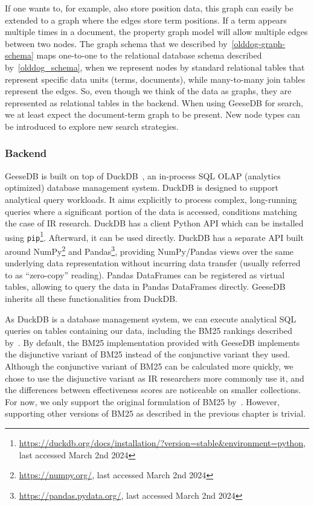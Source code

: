If one wants to, for example, also store position data, this graph can easily be extended to a graph where the edges store term positions. If a term appears multiple times in a document, the property graph model will allow multiple edges between two nodes. The graph schema that we described by~\cref{olddog-graph-schema} maps one-to-one to the relational database schema described by~\cref{olddog_schema}, when we represent nodes by standard relational tables that represent specific data units (terms, documents), while many-to-many join tables represent the edges. So, even though we think of the data as graphs, they are represented as relational tables in the backend. When using GeeseDB for search, we at least expect the document-term graph to be present. New node types can be introduced to explore new search strategies. 

\subsubsection{Backend}
GeeseDB is built on top of DuckDB~\citep{duckdb}, an in-process SQL OLAP (analytics optimized) database management system. DuckDB is designed to support analytical query workloads. It aims explicitly to process complex, long-running queries where a significant portion of the data is accessed, conditions matching the case of IR research. DuckDB has a client Python API which can be installed using \texttt{pip}\footnote{\url{https://duckdb.org/docs/installation/?version=stable&environment=python}, last accessed March 2nd 2024}. Afterward, it can be used directly. DuckDB has a separate API built around NumPy\footnote{\url{https://numpy.org/}, last accessed March 2nd 2024} and Pandas\footnote{\url{https://pandas.pydata.org/}, last accessed March 2nd 2024}, providing NumPy/Pandas views over the same underlying data representation without incurring data transfer (usually referred to as ``zero-copy'' reading). Pandas DataFrames can be registered as virtual tables, allowing to query the data in Pandas DataFrames directly. GeeseDB inherits all these functionalities from DuckDB.

As DuckDB is a database management system, we can execute analytical SQL queries on tables containing our data, including the BM25 rankings described by~\citet{OldDog}. By default, the BM25 implementation provided with GeeseDB implements the disjunctive variant of BM25 instead of the conjunctive variant they used. Although the conjunctive variant of BM25 can be calculated more quickly, we chose to use the disjunctive variant as IR researchers more commonly use it, and the differences between effectiveness scores are noticeable on smaller collections. For now, we only support the original formulation of BM25 by~\citet{bm25-robertson}. However, supporting other versions of BM25 as described in the previous chapter is trivial.

